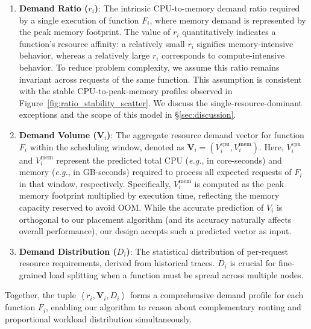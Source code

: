 \begin{enumerate}
    \item \textbf{Demand Ratio ($r_i$)}: The intrinsic CPU-to-memory demand ratio required 
    by a single execution of function $F_i$, where memory demand is represented
    by the peak memory footprint. The value of $r_i$ quantitatively 
    indicates a function's resource affinity: a relatively small $r_i$ signifies 
    memory-intensive behavior, whereas a relatively large $r_i$ corresponds to 
    compute-intensive behavior. To reduce problem complexity, we assume this 
    ratio remains invariant across requests of the same function. This assumption
    is consistent with the stable CPU-to-peak-memory profiles observed in Figure~\ref{fig:ratio_stability_scatter}. 
    We discuss
    the single-resource-dominant exceptions and the scope of this model in
    \S\ref{sec:discussion}.

    \item \textbf{Demand Volume ($\mathbf{V}_i$)}: The aggregate resource demand 
    vector for function $F_i$ within the scheduling window, denoted as 
    $\mathbf{V}_i = \left(V_i^{\text{cpu}}, V_i^{\text{mem}}\right)$. Here, $V_i^{\text{cpu}}$ and 
    $V_i^{\text{mem}}$ represent the predicted total CPU (\emph{e.g.}, in core-seconds) 
    and memory (\emph{e.g.}, in GB-seconds) required to process all expected 
    requests of $F_i$ in that window, respectively. Specifically, $V_i^{\text{mem}}$
    is computed as the peak memory footprint multiplied by execution time,
    reflecting the memory capacity reserved to avoid OOM. While the accurate 
    prediction of $V_i$ is orthogonal to our placement algorithm (and its accuracy 
    naturally affects overall performance), our design accepts such a predicted 
    vector as input.

    \item \textbf{Demand Distribution ($D_i$)}: The statistical distribution of 
    per-request resource requirements, derived from historical traces. $D_i$ is 
    crucial for fine-grained load splitting when a function must be spread across 
    multiple nodes.
\end{enumerate}
Together, the tuple $\left<r_i, \mathbf{V}_i, D_i\right>$ forms a comprehensive 
demand profile for each function $F_i$, enabling our algorithm to reason about 
complementary routing and proportional workload distribution simultaneously.

